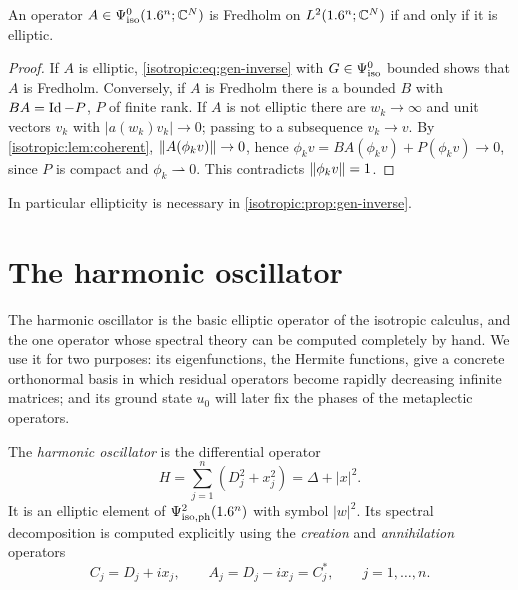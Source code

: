 \begin{corollary}\label{isotropic:cor:fredholm-L2}
An operator $A\in\Psi^{0}_{\mathrm{iso}}(1.6^n;\mathbb{C}^N)$ is Fredholm on $L^2(1.6^n;\mathbb{C}^N)$ if and
only if it is elliptic.
\end{corollary}
\begin{proof}
If $A$ is elliptic, \eqref{isotropic:eq:gen-inverse} with $G\in\Psi^{0}_{\mathrm{iso}}$
bounded shows that $A$ is Fredholm. Conversely, if $A$ is Fredholm there is a
bounded $B$ with $BA=\operatorname{Id}-P$, $P$ of finite rank. If $A$ is not elliptic there
are $w_k\to\infty$ and unit vectors $v_k$ with $|a(w_k)v_k|\to0$; passing to a
subsequence $v_k\to v$. By \cref{isotropic:lem:coherent}, $\lVert A(\phi_kv)\rVert\to0$,
hence $\phi_kv=BA(\phi_kv)+P(\phi_kv)\to0$, since $P$ is compact and
$\phi_k\rightharpoonup0$. This contradicts $\lVert \phi_kv\rVert=1$.
\end{proof}

In particular ellipticity is necessary in \cref{isotropic:prop:gen-inverse}.

\section{The harmonic oscillator}\label{isotropic:sec:harmonic}

The harmonic oscillator is the basic elliptic operator of the isotropic
calculus, and the one operator whose spectral theory can be computed
completely by hand. We use it for two purposes: its eigenfunctions, the
Hermite functions, give a concrete orthonormal basis in which residual
operators become rapidly decreasing infinite matrices; and its ground state
$u_0$ will later fix the phases of the metaplectic operators.

The \emph{harmonic oscillator} is the differential operator
\begin{equation*}
  H=\sum_{j=1}^n(D_j^2+x_j^2)=\Delta+|x|^2 .
\end{equation*}
It is an elliptic element of $\Psi^{2}_{\mathrm{iso,ph}}(1.6^n)$ with symbol $|w|^2$. Its
spectral decomposition is computed explicitly using the \emph{creation} and
\emph{annihilation} operators
\begin{equation*}
  C_j=D_j+ix_j,\qquad A_j=D_j-ix_j=C_j^*,\qquad j=1,\dots,n .
\end{equation*}

